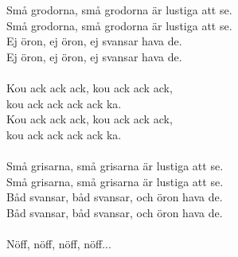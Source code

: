 \vspace{10pt}
Små grodorna, små grodorna är lustiga att se.\\
Små grodorna, små grodorna är lustiga att se.\\
Ej öron, ej öron, ej svansar hava de.\\
Ej öron, ej öron, ej svansar hava de.\\
\\
Kou ack ack ack, kou ack ack ack,\\
kou ack ack ack ack ka.\\
Kou ack ack ack, kou ack ack ack,\\
kou ack ack ack ack ka.\\
\\
Små grisarna, små grisarna är lustiga att se.\\
Små grisarna, små grisarna är lustiga att se.\\
Båd svansar, båd svansar, och öron hava de.\\
Båd svansar, båd svansar, och öron hava de.\\
\\
Nöff, nöff, nöff, nöff...
